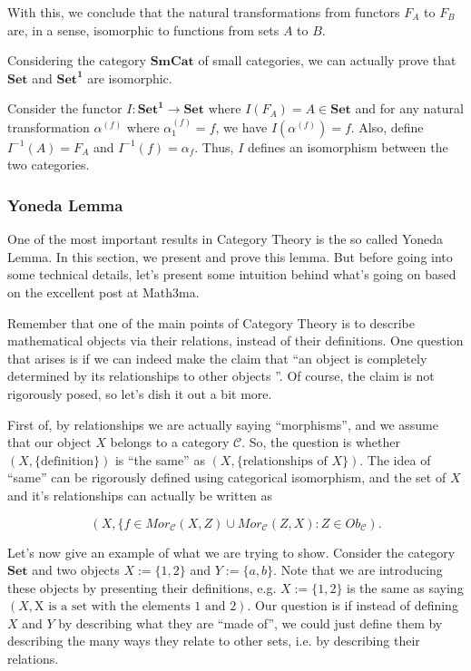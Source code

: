 \begin{example}
	With this, we conclude that the natural transformations from
	functors $F_A$ to $F_B$ are, in a sense, isomorphic to functions from sets
	$A$ to $B$.

	Considering the category $\mathbf{SmCat}$ of small categories, we can actually prove
	that $\mathbf{Set}$ and $\mathbf{Set}^{\bm 1}$ are isomorphic.

	Consider the functor
	$I:\mathbf{Set}^{\bm 1} \to \mathbf{Set}$ where $I(F_A) = A \in \mathbf{Set}$ and
	for any natural transformation $\alpha^{(f)}$ where $\alpha^{(f)}_1 = f$, we have
	$I(\alpha^{(f)}) = f$. Also, define $I^{-1}(A) = F_A$ and
	$I^{-1}(f) = \alpha_f$.
	Thus, $I$ defines an isomorphism between the two categories.

\end{example}

\subsubsection{Yoneda Lemma}

One of the most important results in Category Theory is the so called Yoneda Lemma.
In this section, we present and prove this lemma. But before going into some
technical details, let's present some intuition behind what's
going on based on the excellent post at Math3ma.

Remember that one of the main points of Category Theory is to describe mathematical
objects via their relations, instead of their definitions. One question that
arises is if we can indeed make the claim that ``an object is
completely determined by its relationships to other objects
''. Of course, the claim is not rigorously posed, so let's dish it out a bit more.

First of, by relationships we are actually saying ``morphisms'',
and we assume that our object $X$ belongs to a category $\mathcal C$.
So, the question is whether $(X, \{\text{definition}\})$ is ``the same''
as $(X, \{\text{relationships of }X\})$. The idea of ``same'' can
be rigorously defined using categorical isomorphism, and the
set of $X$ and it's relationships can actually be written as

\begin{equation}
	(X, \{ f \in Mor_\mathcal C(X,Z) \cup Mor_\mathcal C(Z,X): Z \in Ob_\mathcal C).
	\label{eq:relationdef}
\end{equation}

Let's now give an example of what we are trying to show. Consider the category $\mathbf{Set}$
and two objects $X:=\{1,2\}$ and $Y :=\{a,b\}$. Note that we are introducing these objects
by presenting their definitions, e.g. $X:=\{1,2\}$ is the same as saying
$(X,\text{X is a set with the elements 1 and 2})$. Our question is if instead of
defining $X$ and $Y$ by describing what they are ``made of'', we could just
define them by describing the many ways they relate to other sets, i.e. by describing their relations.

